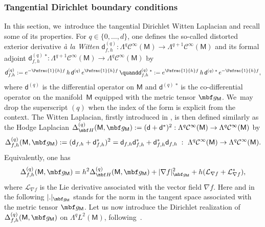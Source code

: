 \subsubsection{Tangential Dirichlet boundary conditions}
\label{sec:LD}
In this section, we~introduce the tangential Dirichlet Witten Laplacian and recall some of its properties.
For $q\in\{0,\dots,d\}$, one defines the so-called distorted exterior
derivative \textit{\`a la Witten} $\mathsf d_{f,h}^{(q)}:\Lambda^{q}
\mathcal C^{\infty}(\mathsf M)\to \Lambda^{q+1} \mathcal
C^{\infty}(\mathsf M)$ and its formal adjoint
$\mathsf d_{f,h}^{(q)} \,^{*}:\Lambda^{q+1} \mathcal
C^{\infty}(\mathsf M)\to \Lambda^{q} \mathcal C^{\infty}(\mathsf M)$ by
\[
\mathsf d_{f,h}^{(q)}:= e^{-\Psfrac{1}{h}f}\, h\, \mathsf d^{(q)} \, e^{\Psfrac{1}{h}f} \, \quand \mathsf d_{f,h}^{(q)}\,^{*}:= e^{\Psfrac{1}{h}f}\,h\,\mathsf d^{(q)}\,^{*}\,e^{-\Psfrac{1}{h}f},
\]
where $\mathsf d^{(q)}$ is the differential operator on $\mathsf M$
and $\mathsf d^{(q)}\,^{*}$ is the co-differential operator on the
manifold~$\mathsf M$ equipped with the metric tensor $\mbf g_{\mathsf
M}$. We~may drop the superscript $(q)$ when the index of the form is
explicit from the context.
The Witten Laplacian, firstly introduced in \cite{witten-82},
is then defined similarly as the Hodge Laplacian $\Delta^{(q)}_{\mbf
H}(\mathsf M,\mbf g_{\mathsf M}):=(\mathsf d+\mathsf
d^*)^2:\Lambda^{q} \mathcal C^{\infty}(\mathsf M)\to \Lambda^{q}
\mathcal C^{\infty}(\mathsf M)$ by
\[
\Delta_{f,h}^{(q)} (\mathsf M,\mbf g_{\mathsf M}):= (\mathsf d_{f,h}+ \mathsf d_{f,h}^*)^2= \mathsf d_{f,h}\mathsf d^{*}_{f,h}+\mathsf d^{*}_{f,h}\mathsf d_{f,h}\;:\ \Lambda^{q} \mathcal C^{\infty}(\mathsf M)\to \Lambda^{q} \mathcal C^{\infty}(\mathsf M).
\]
Equivalently, one has
\begin{equation}\label{dec.delta}
\Delta_{f,h}^{(q)} (\mathsf M,\mbf g_{\mathsf M})=h^2\Delta_{\mbf H}^{(q)}(\mathsf M,\mbf g_{\mathsf M})+\vert \nabla f \vert_{\mbf g_{\mathsf M}}^2+h(\mathcal L_{\nabla f} + \mathcal L_{\nabla f}^*),
\end{equation}
where $\mathcal L_{\nabla f}$ is the Lie derivative associated with
the vector field ${\nabla f}$. Here and in the following $\vert. \vert_{\mbf g_{\mathsf M}} $ stands for the norm in the
tangent space associated with the metric tensor $\mbf g_{\mathsf M}$.
Let us now introduce the Dirichlet realization of
$\Delta_{f,h}^{(q)}(\mathsf M,\mbf g_{\mathsf M})$ on $\Lambda^{q}
L^{2}(\mathsf M)$, following~\cite[\S2.4]{helffer-nier-06}.

